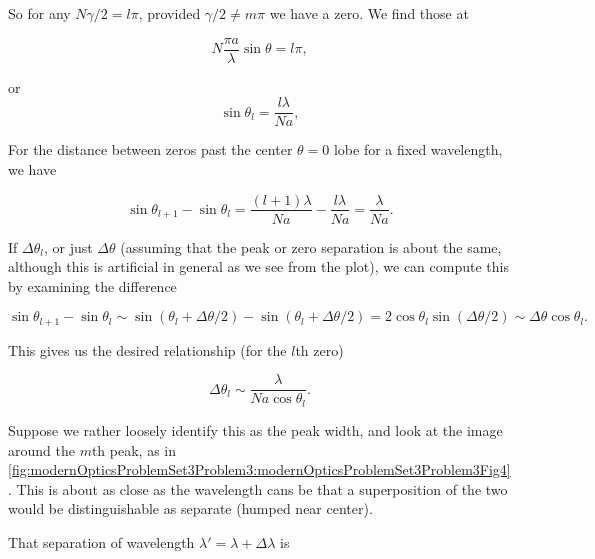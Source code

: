 {So for any $N \gamma/2 = l \pi$, provided $\gamma/2 \ne m \pi$ we have a zero.  We find those at

\begin{dmath}\label{eqn:modernOptics:problemSet3:3:380}
N \frac{\pi a}{\lambda} \sin\theta = l \pi,
\end{dmath}

or
\begin{dmath}\label{eqn:modernOptics:problemSet3:3:400}
\sin\theta_l = \frac{l \lambda}{N a},
\end{dmath}

For the distance between zeros past the center $\theta = 0$ lobe for a fixed wavelength, we have

\begin{dmath}\label{eqn:modernOptics:problemSet3:3:420}
\sin\theta_{l+1} - \sin\theta_l = 
\frac{(l+1) \lambda}{N a}
-
\frac{l \lambda}{N a}
=
\frac{\lambda}{N a}.
\end{dmath}

If $\Delta \theta_l$, or just $\Delta \theta$ (assuming that the peak or zero separation is about the same, although this is artificial in general as we see from the plot), we can compute this by examining the difference

\begin{dmath}\label{eqn:modernOptics:problemSet3:3:440}
\sin\theta_{l+1} - \sin\theta_l 
\sim 
\sin(\theta_l + \Delta \theta/2)
-\sin(\theta_l + \Delta \theta/2)
= 2 \cos \theta_l \sin (\Delta \theta/2)
\sim \Delta \theta \cos\theta_l.
\end{dmath}

This gives us the desired relationship (for the $l$th zero)

\begin{dmath}\label{eqn:modernOptics:problemSet3:3:460}
\boxed{
\Delta \theta_l \sim \frac{\lambda}{N a \cos\theta_l}.
}
\end{dmath}

Suppose we rather loosely identify this as the peak width, and look at the image around the $m$th peak, as in \cref{fig:modernOpticsProblemSet3Problem3:modernOpticsProblemSet3Problem3Fig4}.  This is about as close as the wavelength cans be that a superposition of the two would be distinguishable as separate (humped near center).


That separation of wavelength $\lambda' = \lambda + \Delta \lambda$ is

}
